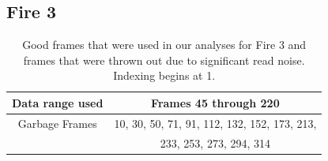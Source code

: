 \documentclass{article}
\begin{document}
\subsection{Fire 3}



\begin{table}
\centering
\begin{tabular}{|c|c|}
\hline
Data range used & Frames 45 through 220 \\
\hline 
Garbage Frames & 10, 30, 50, 71, 91, 112, 132, 152, 173, 213, \\
               & 233, 253, 273, 294, 314 \\

\hline
\end{tabular} 

\caption{Good frames that were used in our analyses for Fire 3 and frames that were thrown out due to significant read noise. Indexing begins at 1.}
\end{table}
\end{document}
